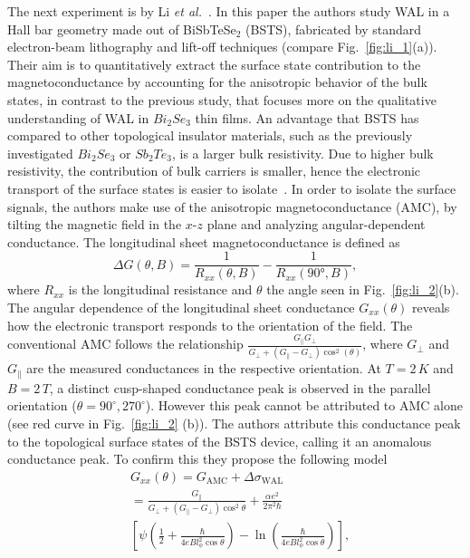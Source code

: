 \documentclass[twocolumn,10pt,a4paper]{article}
\begin{document}
The next experiment is by Li \textit{et al.}~\cite{Li}. In this paper the authors study WAL in a Hall bar geometry  made out of BiSbTeSe$_2$ (BSTS), fabricated by standard electron-beam lithography and lift-off techniques (compare Fig.~\ref{fig:li_1}(a)). Their aim is to quantitatively extract the surface state contribution to the magnetoconductance by accounting for the anisotropic behavior of the bulk states, in contrast to the previous study, that focuses more on the qualitative understanding of WAL in $Bi_2Se_3$ thin films. An advantage that BSTS has compared to other topological insulator materials, such as the previously investigated $Bi_2Se_3$ or $Sb_2Te_3$, is a larger bulk resistivity. Due to higher bulk resistivity, the contribution of bulk carriers is smaller, hence the electronic transport of the surface states is easier to isolate~\cite{Xu_2014}. In order to isolate the surface signals, the authors make use of the anisotropic magnetoconductance (AMC), by tilting the magnetic field in the $x$-$z$ plane and analyzing angular-dependent conductance. The longitudinal sheet magnetoconductance is defined as
\begin{equation}
\Delta G(\theta, B) = \frac{1}{R_{xx}(\theta, B)} -\frac{1}{R_{xx}(90\text{°}, B)},
\label{magnetoconductance}
\end{equation}
where $R_{xx}$ is the longitudinal resistance and $\theta$ the angle seen in Fig.~\ref{fig:li_2}(b). The angular dependence of the longitudinal sheet conductance $G_{xx}(\theta)$ reveals how the electronic transport responds to the orientation of the field. The conventional AMC follows the relationship $\frac{G_\parallel G_\perp}{G_\perp+(G_\parallel-G_\perp)\cos^2(\theta)}$, where $G_\perp$ and $G_\parallel$ are the measured conductances in the respective orientation. At $T=2\,K$ and $B=2\,T$, a distinct cusp-shaped conductance peak is observed in the parallel orientation ($\theta=90^\circ, 270^\circ$). However this peak cannot be attributed to AMC alone (see red curve in Fig.\@~\ref{fig:li_2} (b)). The authors attribute this conductance peak to the topological surface states of the BSTS device, calling it an anomalous conductance peak. To confirm this they propose the following model
\begin{align}
&G_{xx}(\theta) = G_{\mathrm{AMC}} + \Delta \sigma_{\mathrm{WAL}} \nonumber \\
&= \frac{G_\parallel}{G_\perp + (G_\parallel - G_\perp)\cos^2\theta} + \frac{\alpha e^2}{2\pi^2\hbar} \nonumber \\
&\left[\psi\left( \frac{1}{2} + \frac{\hbar}{4eB l_\phi^2 \cos\theta} \right)-\ln\left(\frac{\hbar}{4eB l_\phi^2 \cos\theta} \right)\right],
\label{proposedG_xx}
\end{align}
\end{document}
